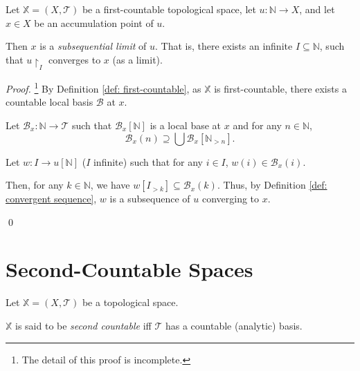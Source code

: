 \begin{proposition}
	Let $\mathbb X = (X, \mathcal T)$ be a first-countable topological space, let $u: \mathbb N \to X$, and let $x \in X$ be an accumulation point of $u$.
	
	Then $x$ is a \textit{subsequential limit} of $u$. That is, there exists an infinite $I \subseteq \mathbb N$, such that $u\restriction_I$ converges to $x$ (as a limit).
	
	\begin{proof}\footnote{
			The detail of this proof is incomplete.
		}
		By Definition \ref{def: first-countable}, as $\mathbb X$ is first-countable, there exists a countable local basis $\mathcal B$ at $x$.
		
		Let $\mathcal B_x: \mathbb N \to \mathcal T$ such that $\mathcal B_x[\mathbb N]$ is a local base at $x$ and for any $n \in \mathbb N$,
		$$
		\mathcal B_x(n) \supseteq \bigcup \mathcal B_x[\mathbb N_{> n}].
		$$
		
		Let $w: I \to u[\mathbb N]$ ($I$ infinite) such that for any $i \in I$, $w(i) \in \mathcal B_x(i)$.
		
		Then, for any $k \in \mathbb N$, we have $w[I_{> k}] \subseteq \mathcal B_x(k)$. Thus, by Definition \ref{def: convergent sequence}, $w$ is a subsequence of $u$ converging to $x$.
		
		\qed
	\end{proof}
\end{proposition}


\section{Second-Countable Spaces}


\begin{definition}
	\label{def: second-countable}
	Let $\mathbb X = (X, \mathcal T)$ be a topological space.
	
	$\mathbb X$ is said to be \textit{second countable} iff $\mathcal T$ has a countable (analytic) basis.
\end{definition}


